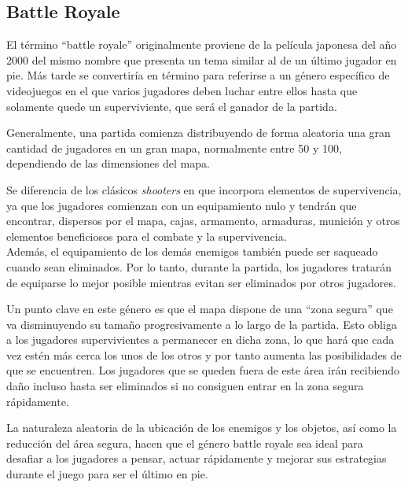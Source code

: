 \subsection{Battle Royale}
El término ``battle royale'' \cite{wiki:BattleRoyale} originalmente proviene de la película japonesa del año 2000 del mismo nombre que presenta un tema similar al de un último jugador en pie.
Más tarde se convertiría en término para referirse a un género específico de videojuegos en el que varios jugadores deben luchar entre ellos hasta que solamente quede un superviviente, que será el ganador de la partida.

Generalmente, una partida comienza distribuyendo de forma aleatoria una gran cantidad de jugadores en un gran mapa, normalmente entre 50 y 100, dependiendo de las dimensiones del mapa.

Se diferencia de los clásicos \textit{shooters} en que incorpora elementos de supervivencia, ya que los jugadores comienzan con un equipamiento nulo y tendrán que encontrar, dispersos por el mapa, cajas, armamento, armaduras, munición y otros elementos beneficiosos para el combate y la supervivencia.\\
Además, el equipamiento de los demás enemigos también puede ser saqueado cuando sean eliminados. Por lo tanto, durante la partida, los jugadores tratarán de equiparse lo mejor posible mientras evitan ser eliminados por otros jugadores.

Un punto clave en este género es que el mapa dispone de una “zona segura” que va disminuyendo su tamaño progresivamente a lo largo de la partida. Esto obliga a los jugadores supervivientes a permanecer en dicha zona, lo que hará que cada vez estén más cerca los unos de los otros y por tanto aumenta las posibilidades de que se encuentren. Los jugadores que se queden fuera de este área irán recibiendo daño incluso hasta ser eliminados si no consiguen entrar en la zona segura rápidamente.

La naturaleza aleatoria de la ubicación de los enemigos y los objetos, así como la reducción del área segura, hacen que el género battle royale sea ideal para desafiar a los jugadores a pensar, actuar rápidamente y mejorar sus estrategias durante el juego para ser el último en pie.
